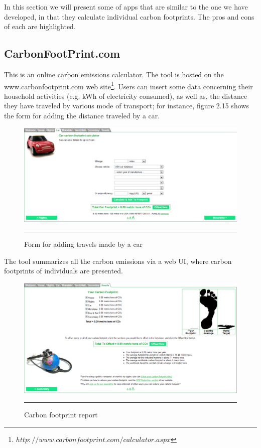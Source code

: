 In this section we will present some of apps that are similar to the one we have developed, in that they calculate individual carbon footprints. The pros and cons of each are highlighted.

\subsection{CarbonFootPrint.com}

This is an online carbon emissions calculator. The tool is hosted on the www.carbonfootprint.com web site\footnote{$http://www.carbonfootprint.com/calculator.aspx$}.
Users can insert some data concerning their household activities (e.g. kWh of electricity consumed), as well as, the distance they have traveled by various mode of transport; for instance, figure 2.15 shows the form for adding the distance traveled by a car.

\begin{figure}[htbp]
	\centering
		\includegraphics[scale=0.30]{./Figures/chapter2/figure18.pdf}
		\rule{35em}{0.5pt}
	\caption[Form for adding travels made by a car]{Form for adding travels made by a car}
	\label{fig:carbonFootprintCom}
\end{figure}

The tool summarizes all the carbon emissions via a web UI, where carbon footprints of individuals are presented.

\begin{figure}[htbp]
	\centering
		\includegraphics[scale=0.30]{./Figures/chapter2/figure19.pdf}
		\rule{35em}{0.5pt}
	\caption[Carbon footprint report]{Carbon footprint report}
	\label{fig:carbonFootprintCom2}
\end{figure}

